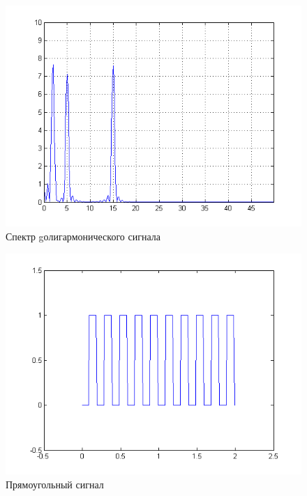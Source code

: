 \begin{figure}[H]
   \includegraphics[scale=0.7]{lab5/poly_spectro.png}
   \caption{Спектр gолигармонического сигнала}
\end{figure}

\begin{figure}[H]
   \includegraphics[scale=0.7]{lab5/rect.png}
   \caption{Прямоугольный сигнал}
\end{figure}

